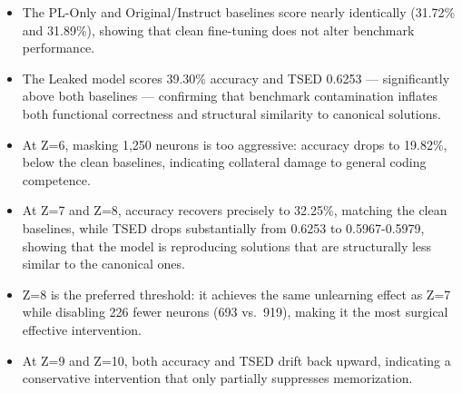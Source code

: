 \documentclass[mscthesis]{usiinfthesis}
\begin{document}
\begin{tcolorbox}[
  colback=blue!5!white,
  colframe=blue!40!black,
  title=\textbf{Findings — Inference Pipeline Evaluation},
  fonttitle=\bfseries,
  rounded corners,
  arc=4pt
]
\begin{itemize}
  \item The PL-Only and Original/Instruct baselines score nearly identically (31.72\% and 31.89\%), showing that clean fine-tuning does not alter benchmark performance.
  \item The Leaked model scores 39.30\% accuracy and TSED 0.6253 — significantly above both baselines — confirming that benchmark contamination inflates both functional correctness and structural similarity to canonical solutions.
  \item At Z=6, masking 1,250 neurons is too aggressive: accuracy drops to 19.82\%, below the clean baselines, indicating collateral damage to general coding competence.
  \item At Z=7 and Z=8, accuracy recovers precisely to 32.25\%, matching the clean baselines, while TSED drops substantially from 0.6253 to 0.5967-0.5979, showing that the model is reproducing solutions that are structurally less similar to the canonical ones.
  \item Z=8 is the preferred threshold: it achieves the same unlearning effect as Z=7 while disabling 226 fewer neurons (693 vs.\ 919), making it the most surgical effective intervention.
  \item At Z=9 and Z=10, both accuracy and TSED drift back upward, indicating a conservative intervention that only partially suppresses memorization.
\end{itemize}
\end{tcolorbox}
\end{document}
